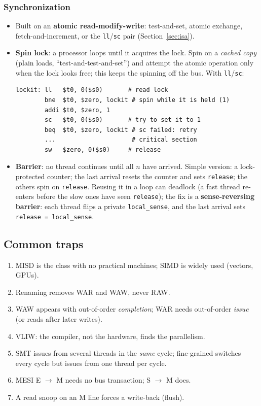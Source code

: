\subsubsection{Synchronization}
\begin{itemize}[leftmargin=*]
  \item Built on an \textbf{atomic read-modify-write}: test-and-set, atomic exchange,
  fetch-and-increment, or the \texttt{ll}/\texttt{sc} pair (Section~\ref{sec:isa}).
  \item \textbf{Spin lock}: a processor loops until it acquires the lock. Spin on a
  \emph{cached copy} (plain loads, ``test-and-test-and-set'') and attempt the atomic
  operation only when the lock looks free; this keeps the spinning off the bus. With
  \texttt{ll}/\texttt{sc}:
\begin{lstlisting}
lockit: ll   $t0, 0($s0)       # read lock
        bne  $t0, $zero, lockit # spin while it is held (1)
        addi $t0, $zero, 1
        sc   $t0, 0($s0)       # try to set it to 1
        beq  $t0, $zero, lockit # sc failed: retry
        ...                     # critical section
        sw   $zero, 0($s0)     # release
\end{lstlisting}
  \item \textbf{Barrier}: no thread continues until all $n$ have arrived. Simple
  version: a lock-protected counter; the last arrival resets the counter and sets
  \texttt{release}; the others spin on \texttt{release}. Reusing it in a loop can
  deadlock (a fast thread re-enters before the slow ones have seen
  \texttt{release}); the fix is a \textbf{sense-reversing barrier}: each thread
  flips a private \texttt{local\_sense}, and the last arrival sets
  \texttt{release = local\_sense}.
\end{itemize}

\subsection{Common traps}
\begin{enumerate}[leftmargin=*]
  \item MISD is the class with no practical machines; SIMD is widely used (vectors,
  GPUs).
  \item Renaming removes WAR and WAW, never RAW.
  \item WAW appears with out-of-order \emph{completion}; WAR needs out-of-order
  \emph{issue} (or reads after later writes).
  \item VLIW: the compiler, not the hardware, finds the parallelism.
  \item SMT issues from several threads in the \emph{same} cycle; fine-grained
  switches every cycle but issues from one thread per cycle.
  \item MESI E $\to$ M needs no bus transaction; S $\to$ M does.
  \item A read snoop on an M line forces a write-back (flush).
\end{enumerate}

